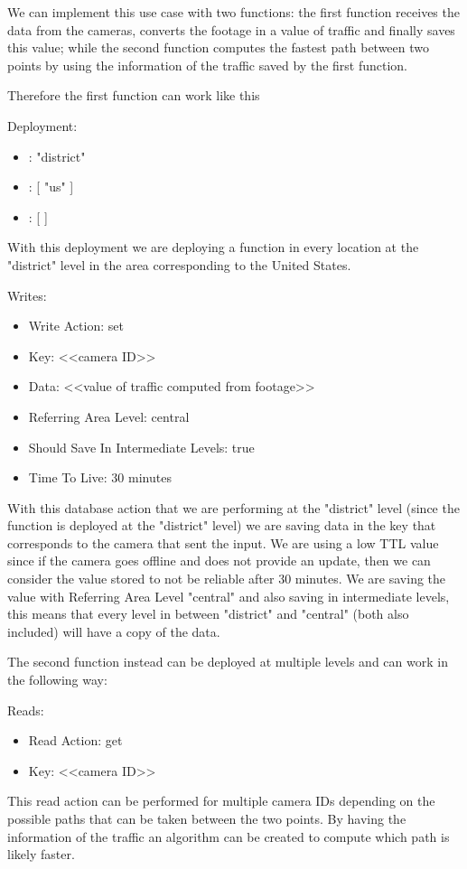 We can implement this use case with two functions: the first function receives the data from the cameras, converts the footage in a value of traffic and finally saves this value; while the second function computes the fastest path between two points by using the information of the traffic saved by the first function.

Therefore the first function can work like this
\begin{example}
Deployment:
\begin{itemize}
    \item {}: "district"
    \item {}: [ "us" ]
    \item {}: [ ]
\end{itemize}
With this deployment we are deploying a function in every location at the "district" level in the area corresponding to the United States.

Writes:
\begin{itemize}
    \item Write Action: set
    \item Key: <<camera ID>>
    \item Data: <<value of traffic computed from footage>>
    \item Referring Area Level: central
    \item Should Save In Intermediate Levels: true
    \item Time To Live: 30 minutes
\end{itemize}
With this database action that we are performing at the "district" level (since the function is deployed at the "district" level) we are saving data in the key that corresponds to the camera that sent the input. We are using a low TTL value since if the camera goes offline and does not provide an update, then we can consider the value stored to not be reliable after 30 minutes.
We are saving the value with Referring Area Level "central" and also saving in intermediate levels, this means that every level in between "district" and "central" (both also included) will have a copy of the data.
\end{example}

The second function instead can be deployed at multiple levels and can work in the following way:
\begin{example}
Reads:
\begin{itemize}
    \item Read Action: get
    \item Key: <<camera ID>>
\end{itemize}
This read action can be performed for multiple camera IDs depending on the possible paths that can be taken between the two points.
By having the information of the traffic an algorithm can be created to compute which path is likely faster. 
\end{example}


